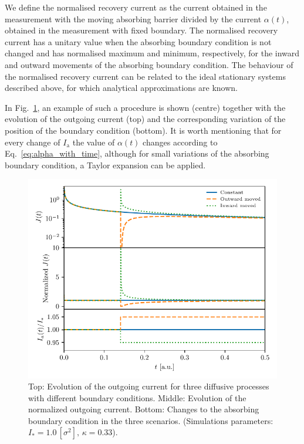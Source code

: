 {We define the normalised recovery current as the current obtained in the measurement with the moving absorbing barrier divided by the current $\alpha(t)$, obtained in the measurement with fixed boundary. The normalised recovery current has a unitary value when the absorbing boundary condition is not changed and has normalised maximum and minimum, respectively, for the inward and outward movements of the absorbing boundary condition. The behaviour of the normalised recovery current can be related to the ideal stationary systems described above, for which analytical approximations are known.

In Fig.~\ref{fig:fixed-vs-moved-boundary}, an example of such a procedure is shown (centre) together with the evolution of the outgoing current (top) and the corresponding variation of the position of the boundary condition (bottom). It is worth mentioning that for every change of $I_\mathrm{a}$ the value of $\alpha(t)$ changes according to Eq.~\eqref{eq:alpha_with_time}, although for small variations of the absorbing boundary condition, a Taylor expansion can be applied.

\begin{figure}[htp]
    \centering
    \includegraphics[width=\textwidth]{4_probing_the_diffusive_behavior/figs/final/global_vs_moving_current.pdf}
    \caption{Top: Evolution of the outgoing current for three diffusive processes with different boundary conditions. Middle: Evolution of the normalized outgoing current. Bottom: Changes to the absorbing boundary condition in the three scenarios. (Simulations parameters: $I_\ast = 1.0\,[\sigma^2], \, \kappa = 0.33$).}
    \label{fig:fixed-vs-moved-boundary}
\end{figure}

}
